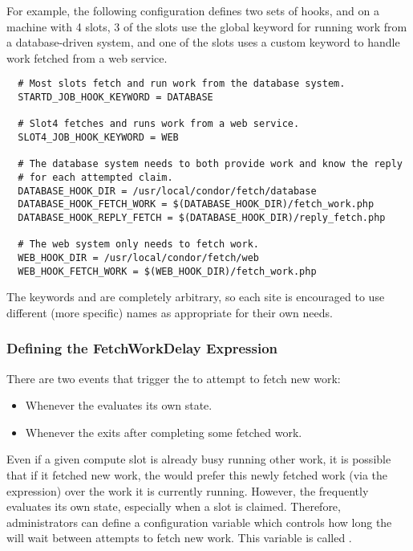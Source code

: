 For example, the following configuration defines two sets of hooks,
and on a machine with 4 slots, 3 of the slots use the global keyword
for running work from a database-driven system, and one of the slots
uses a custom keyword to handle work fetched from a web service.
\begin{verbatim}
  # Most slots fetch and run work from the database system.
  STARTD_JOB_HOOK_KEYWORD = DATABASE

  # Slot4 fetches and runs work from a web service.
  SLOT4_JOB_HOOK_KEYWORD = WEB

  # The database system needs to both provide work and know the reply
  # for each attempted claim.
  DATABASE_HOOK_DIR = /usr/local/condor/fetch/database
  DATABASE_HOOK_FETCH_WORK = $(DATABASE_HOOK_DIR)/fetch_work.php
  DATABASE_HOOK_REPLY_FETCH = $(DATABASE_HOOK_DIR)/reply_fetch.php

  # The web system only needs to fetch work.
  WEB_HOOK_DIR = /usr/local/condor/fetch/web
  WEB_HOOK_FETCH_WORK = $(WEB_HOOK_DIR)/fetch_work.php
\end{verbatim}

The keywords  and  are completely arbitrary, so
each site is encouraged to use different (more specific) names as
appropriate for their own needs.


\subsubsection{\label{sec:job-hooks-fetch-work-delay}
Defining the FetchWorkDelay Expression}

There are two events that trigger the  to attempt to
fetch new work:
\begin{itemize}
\item Whenever the  evaluates its own state.
\item Whenever the  exits after completing some
  fetched work.
\end{itemize}

Even if a given compute slot is already busy running other work, it is
possible that if it fetched new work, the  would prefer
this newly fetched work (via the  expression) over the work it
is currently running.
However, the  frequently evaluates its own state,
especially when a slot is claimed.
Therefore, administrators can define a configuration variable which controls
how long the  will wait between attempts to fetch new work.
This variable is called .

